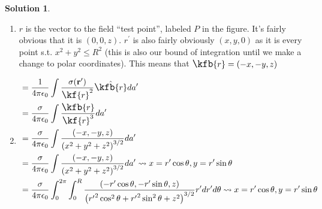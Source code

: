 \documentclass[10pt]{article}
\theoremstyle{definition}
\newtheorem{soln}{Solution}
\newcommand{\primed}[1]{#1^\prime}
\newcommand{\scriptr}{\fontsize{12pt}{12pt}\kf{r}}
\newcommand{\bscriptr}{\fontsize{12pt}{12pt}\kfb{r}}
\begin{document}
\begin{soln}
\begin{enumerate}[label=(\alph*)]
\begin{center}
          \end{center}
    \item $r$ is the vector to the field ``test point'', labeled $P$ in the figure. It's fairly obvious that it is $(0,0,z)$.
          $\primed{r}$ is also fairly obviously $(x,y,0)$ as it is every point s.t. $x^2+y^2\leq R^2$ (this is also our bound of integration until we make a change to polar coordinates).
          This means that $\bscriptr=(-x,-y,z)$
    \item \begin{align*}
             & = \frac{1}{4\pi\epsilon_0}\int\frac{\sigma(\mathbf{\primed{r}})}{\scriptr^2}\hat{\bscriptr}d\primed{a}                                                                                                                               \\
             & = \frac{\sigma}{4\pi\epsilon_0}\int\frac{\bscriptr}{\scriptr^3}d\primed{a}                                                                                                                                                           \\
             & = \frac{\sigma}{4\pi\epsilon_0}\int\frac{(-x,-y,z)}{\left(x^2+y^2+z^2\right)^{3/2}}d\primed{a}                                                                                                                                       \\
             & = \frac{\sigma}{4\pi\epsilon_0}\int\frac{(-x,-y,z)}{\left(x^2+y^2+z^2\right)^{3/2}}d\primed{a} \rightsquigarrow x=\primed{r}\cos\theta,y=\primed{r}\sin\theta                                                                        \\
             & = \frac{\sigma}{4\pi\epsilon_0}\int_0^{2\pi}\int_0^R\frac{(-\primed{r}\cos\theta,-\primed{r}\sin\theta,z)}{\left({\primed{r}}^2\cos^2\theta+{\primed{r}}^2\sin^2\theta+z^2\right)^{3/2}}\primed{r}d\primed{r}d\theta
            \rightsquigarrow x=\primed{r}\cos\theta,y=\primed{r}\sin\theta                                                                                                                                                                          \\

\end{align*}
\end{enumerate}
\end{soln}
\end{document}
